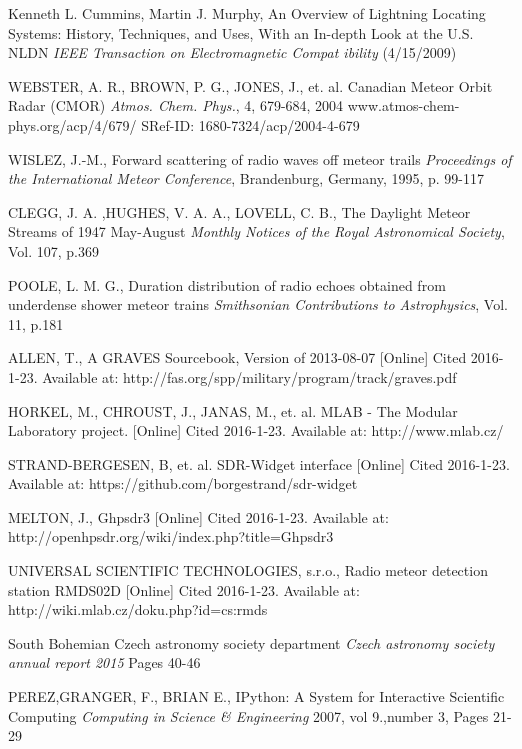 \documentclass[twoside]{ctuthesis}
\theoremstyle{plain}
\theoremstyle{definition}
\theoremstyle{note}
\begin{document}
\begin{thebibliography}{99}
Kenneth L. Cummins, Martin J. Murphy,
An Overview of Lightning Locating Systems: History, Techniques, and Uses, With an In-depth Look at 
the U.S. NLDN \emph{IEEE Transaction on Electromagnetic Compat
ibility} (4/15/2009)


WEBSTER, A. R., BROWN, P. G., JONES, J., et. al.
Canadian Meteor Orbit Radar (CMOR)
\emph{Atmos. Chem. Phys.}, 4, 679-684, 2004
www.atmos-chem-phys.org/acp/4/679/
SRef-ID: 1680-7324/acp/2004-4-679

WISLEZ, J.-M.,
Forward scattering of radio waves off meteor trails
\emph{Proceedings of the International Meteor Conference}, Brandenburg, Germany, 1995, p. 99-117

CLEGG, J. A. ,HUGHES,  V. A. A., LOVELL, C. B., 
The Daylight Meteor Streams of 1947 May-August
\emph{Monthly Notices of the Royal Astronomical Society}, Vol. 107, p.369

POOLE, L. M. G.,
Duration distribution of radio echoes obtained from underdense shower meteor trains
\emph{Smithsonian Contributions to Astrophysics}, Vol. 11, p.181

ALLEN, T.,
A GRAVES Sourcebook, Version of 2013-08-07
[Online] Cited 2016-1-23. Available at: http://fas.org/spp/military/program/track/graves.pdf

HORKEL, M., CHROUST, J., JANAS, M., et. al. 
MLAB - The Modular Laboratory project.
[Online] Cited 2016-1-23. Available at: http://www.mlab.cz/

STRAND-BERGESEN, B, et. al.
SDR-Widget interface
[Online] Cited 2016-1-23. Available at: https://github.com/borgestrand/sdr-widget

MELTON, J.,
Ghpsdr3
[Online] Cited 2016-1-23. Available at: http://openhpsdr.org/wiki/index.php?title=Ghpsdr3

UNIVERSAL SCIENTIFIC TECHNOLOGIES, s.r.o.,  
Radio meteor detection station RMDS02D
[Online] Cited 2016-1-23. Available at: http://wiki.mlab.cz/doku.php?id=cs:rmds

South Bohemian Czech astronomy society department
\emph{Czech astronomy society annual report 2015}
Pages 40-46

PEREZ,GRANGER, F.,  BRIAN E.,
IPython: A System for Interactive Scientific Computing
\emph{Computing in Science \& Engineering}
2007, vol 9.,number 3,  Pages 21-29


\end{thebibliography}
\end{document}
